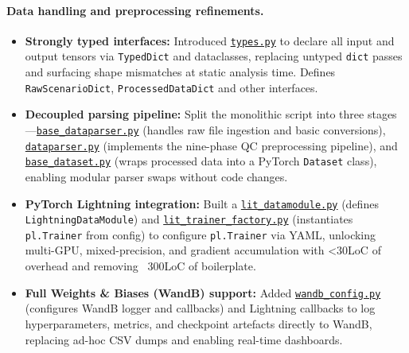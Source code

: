 \paragraph{Data handling and preprocessing refinements.}
\begin{itemize}[leftmargin=*]
  \item \textbf{Strongly typed interfaces:} Introduced \href{https://github.com/JanDuchscherer104/UniTraj/blob/main/unitraj/datasets/types.py}{\texttt{types.py}} to declare all input and output tensors via \texttt{TypedDict} and dataclasses, replacing untyped \texttt{dict} passes and surfacing shape mismatches at static analysis time. Defines \texttt{RawScenarioDict}, \texttt{ProcessedDataDict} and other interfaces.
  \item \textbf{Decoupled parsing pipeline:} Split the monolithic script into three stages—\href{https://github.com/JanDuchscherer104/UniTraj/blob/main/unitraj/datasets/base_dataparser.py}{\texttt{base\_dataparser.py}} (handles raw file ingestion and basic conversions), \href{https://github.com/JanDuchscherer104/UniTraj/blob/main/unitraj/datasets/dataparser.py}{\texttt{dataparser.py}} (implements the nine-phase QC preprocessing pipeline), and \href{https://github.com/JanDuchscherer104/UniTraj/blob/main/unitraj/datasets/base_dataset.py}{\texttt{base\_dataset.py}} (wraps processed data into a PyTorch \texttt{Dataset} class), enabling modular parser swaps without code changes.
  \item \textbf{PyTorch Lightning integration:} Built a \href{https://github.com/JanDuchscherer104/UniTraj/blob/main/unitraj/lightning/lit_datamodule.py}{\texttt{lit\_datamodule.py}} (defines \texttt{LightningDataModule}) and \href{https://github.com/JanDuchscherer104/UniTraj/blob/main/unitraj/lightning/lit_trainer_factory.py}{\texttt{lit\_trainer\_factory.py}} (instantiates \texttt{pl.Trainer} from config) to configure \texttt{pl.Trainer} via YAML, unlocking multi-GPU, mixed-precision, and gradient accumulation with <30LoC of overhead and removing ~300LoC of boilerplate.
  \item \textbf{Full Weights \& Biases (WandB) support:} Added \href{https://github.com/JanDuchscherer104/UniTraj/blob/main/unitraj/configs/wandb_config.py}{\texttt{wandb\_config.py}} (configures WandB logger and callbacks) and Lightning callbacks to log hyperparameters, metrics, and checkpoint artefacts directly to WandB, replacing ad-hoc CSV dumps and enabling real-time dashboards.
\end{itemize}

